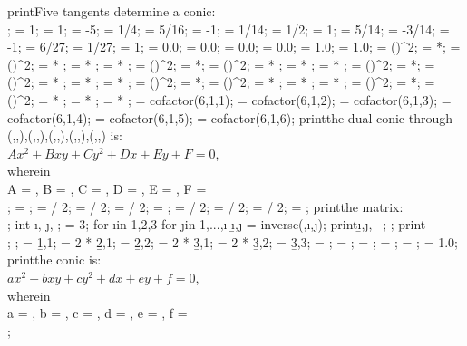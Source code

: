 \documentclass[tikz,border=10pt]{standalone}
\begin{document}
{  %
  print{Five tangents determine a conic:\\};
   = 1;   = 1;  = -5;
   = 1/4;   = 5/16;  = -1;
   = 1/14;   = 1/2;  = 1;
   = 5/14;   = -3/14;  = -1;
   = 6/27;   = 1/27;  = 1;
   = 0.0;      = 0.0;      = 0.0;      = 0.0;        = 1.0;        = 1.0;
   = ()^2;  = *;  = ()^2;  =  * ;  =  * ;  =  * ; 
   = ()^2;  = *;  = ()^2;  =  * ;  =  * ;  =  * ; 
   = ()^2;  = *;  = ()^2;  =  * ;  =  * ;  =  * ; 
   = ()^2;  = *;  = ()^2;  =  * ;  =  * ;  =  * ; 
   = ()^2;  = *;  = ()^2;  =  * ;  =  * ;  =  * ; 
  \A = cofactor(6,1,1);
  \B = cofactor(6,1,2);
  \C = cofactor(6,1,3);
  \D = cofactor(6,1,4);
  \E = cofactor(6,1,5);
  \F = cofactor(6,1,6);
  print{the dual conic through (,,),(,,),(,,),(,,),(,,) is:\\$Ax^2+Bxy+Cy^2+Dx+Ey+F=0$, \\wherein\\ A = \A, B = \B, C = \C, D = \D, E = \E, F = \F \\};
   = \A;      = \B / 2;  = \D / 2;
   = \B / 2;  = \C;      = \E / 2;
   = \D / 2;  = \E / 2;  = \F;
  print{the matrix:\\};
  int \i, \j, \n;
  \n = 3;
  for \i in {1,2,3}{
    for \j in {1,...,\i}{
      \b{\i,\j} = inverse(\n,\i,\j);
      print{\b{\i,\j}, \ };
    };
    print{\\};
  };
  \A = \b{1,1}; 
  \B = 2 * \b{2,1};
  \C = \b{2,2};
  \D = 2 * \b{3,1};
  \E = 2 * \b{3,2};
  \F = \b{3,3};
  \A = \fpeval{\A / \F}; 
  \B = \fpeval{\B / \F};
  \C = \fpeval{\C / \F};
  \D = \fpeval{\D / \F};
  \E = \fpeval{\E / \F};
  \F = 1.0;
  print{the conic is:\\$ax^2+bxy+cy^2+dx+ey+f=0$, \\wherein\\ a = \A, b = \B, c = \C, d = \D, e = \E, f = \F \\};
}
\end{document}
